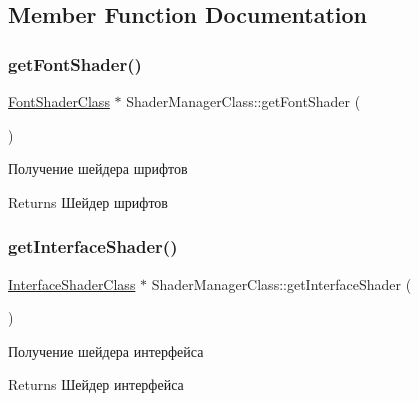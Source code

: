 \subsection{Member Function Documentation}
\mbox{\label{class_shader_manager_class_a47b797b06bf218ce516a74ab4e638a11}} 
\subsubsection{\texorpdfstring{get\+Font\+Shader()}{getFontShader()}}
{\footnotesize\ttfamily \hyperlink{class_font_shader_class}{Font\+Shader\+Class} $\ast$ Shader\+Manager\+Class\+::get\+Font\+Shader (\begin{DoxyParamCaption}{ }\end{DoxyParamCaption})}



Получение шейдера шрифтов 

\begin{DoxyReturn}{Returns}
Шейдер шрифтов 
\end{DoxyReturn}
\mbox{\label{class_shader_manager_class_a25f673a421424fa463ce8ccfba96467c}} 
\subsubsection{\texorpdfstring{get\+Interface\+Shader()}{getInterfaceShader()}}
{\footnotesize\ttfamily \hyperlink{class_interface_shader_class}{Interface\+Shader\+Class} $\ast$ Shader\+Manager\+Class\+::get\+Interface\+Shader (\begin{DoxyParamCaption}{ }\end{DoxyParamCaption})}



Получение шейдера интерфейса 

\begin{DoxyReturn}{Returns}
Шейдер интерфейса 
\end{DoxyReturn}
\mbox{\label{class_shader_manager_class_a3d029bf8f178ee3fce2eb41e0fdd1ca5}} 
